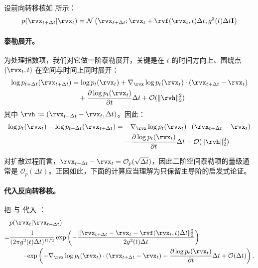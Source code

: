 设前向转移核如  所示：
\begin{equation*}
p(\rvx_{t+\Delta t} | \rvx_t) = \mathcal{N}\left(\rvx_{t+\Delta t}; \rvx_t + \rvf(\rvx_t, t)\Delta t, g^2(t)\Delta t \mathbf{I}\right)
\end{equation*}

\paragraph{泰勒展开。}
为处理指数项，我们对它做一阶泰勒展开，关键是在 $t$ 的时间方向上、围绕点 $(\rvx_t, t)$ 在空间与时间上同时展开：
\begin{align*}
    \log p_{t+\Delta t}(\rvx_{t+\Delta t}) &= \log p_t(\rvx_t) + \nabla_{\rvx} \log p_t(\rvx_t) \cdot (\rvx_{t+\Delta t} - \rvx_t) \nonumber \\
    &\quad + \frac{\partial \log p_t(\rvx_t)}{\partial t} \Delta t + \mathcal{O}(\|\rvh\|_2^2)
\end{align*}
其中 $\rvh := (\rvx_{t+\Delta t} - \rvx_t, \Delta t)$。因此：
\begin{align}
    \log p_t(\rvx_t) - \log p_{t+\Delta t}(\rvx_{t+\Delta t}) &= -\nabla_{\rvx} \log p_t(\rvx_t) \cdot (\rvx_{t+\Delta t} - \rvx_t) \nonumber \\
    &\quad - \frac{\partial \log p_t(\rvx_t)}{\partial t} \Delta t + \mathcal{O}(\|\rvh\|_2^2) \label{eq:log-difference}
\end{align}

对扩散过程而言，$\rvx_{t+\Delta t}-\rvx_t=\mathcal O_p(\sqrt{\Delta t})$，因此二阶空间泰勒项的量级通常是 $\mathcal O_p(\Delta t)$。正因如此，下面的计算应当理解为只保留主导阶的启发式论证。

\paragraph{代入反向转移核。}
把  与  代入 ：
\begin{align*}
    &p(\rvx_t | \rvx_{t+\Delta t}) \nonumber \\
    = &\frac{1}{(2\pi g^2(t) \Delta t)^{D/2}} \exp\left(-\frac{\|\rvx_{t+\Delta t} - \rvx_t - \rvf(\rvx_t, t) \Delta t\|_2^2}{2 g^2(t) \Delta t}\right) \nonumber \\
    &\qquad \cdot \exp\left(-\nabla_{\rvx} \log p_t(\rvx_t) \cdot (\rvx_{t+\Delta t} - \rvx_t) - \frac{\partial \log p_t(\rvx_t)}{\partial t} \Delta t +\mathcal{O}(\Delta t)\right).
\end{align*}
